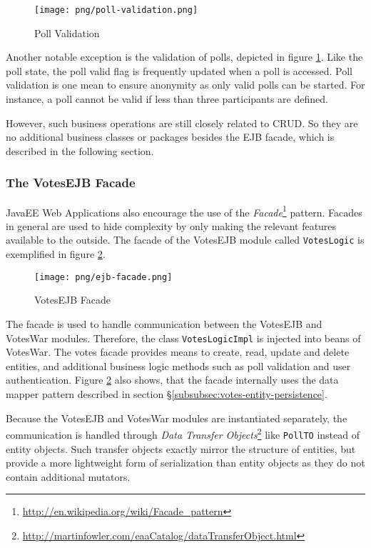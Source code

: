 \begin{figure}[h]
\centering
\texttt{[image: png/poll-validation.png]}
\caption{Poll Validation}
\label{figure:poll-validation}
\end{figure}

Another notable exception is the validation of polls, depicted in figure \ref{figure:poll-validation}.
Like the poll state, the poll valid flag is frequently updated when a poll is accessed.
Poll validation is one mean to ensure anonymity as only valid polls can be started.
For instance, a poll cannot be valid if less than three participants are defined.

However, such business operations are still closely related to CRUD.
So they are no additional business classes or packages besides the EJB facade, which is described in the following section.

\subsubsection{The VotesEJB Facade}
\label{subsubsec:the-votesejb-facade}
JavaEE Web Applications also encourage the use of the \textit{Facade}\footnote{\url{http://en.wikipedia.org/wiki/Facade_pattern}} pattern.
Facades in general are used to hide complexity by only making the relevant features available to the outside.
The facade of the VotesEJB module called \texttt{VotesLogic} is exemplified in figure \ref{figure:ejb-facade}.

\begin{figure}[h]
\centering
\texttt{[image: png/ejb-facade.png]}
\caption{VotesEJB Facade}
\label{figure:ejb-facade}
\end{figure}

The facade is used to handle communication between the VotesEJB and VotesWar modules.
Therefore, the class \texttt{VotesLogicImpl} is injected into beans of VotesWar.
The votes facade provides means to create, read, update and delete entities, and additional business logic methods such as poll validation and user authentication.
Figure \ref{figure:ejb-facade} also shows, that the facade internally uses the data mapper pattern described in section §\ref{subsubsec:votes-entity-persistence}.

Because the VotesEJB and VotesWar modules are instantiated separately, the communication is handled through \textit{Data Transfer Objects}\footnote{\url{http://martinfowler.com/eaaCatalog/dataTransferObject.html}} like \texttt{PollTO} instead of entity objects.
Such transfer objects exactly mirror the structure of entities, but provide a more lightweight form of serialization than entity objects as they do not contain additional mutators.



